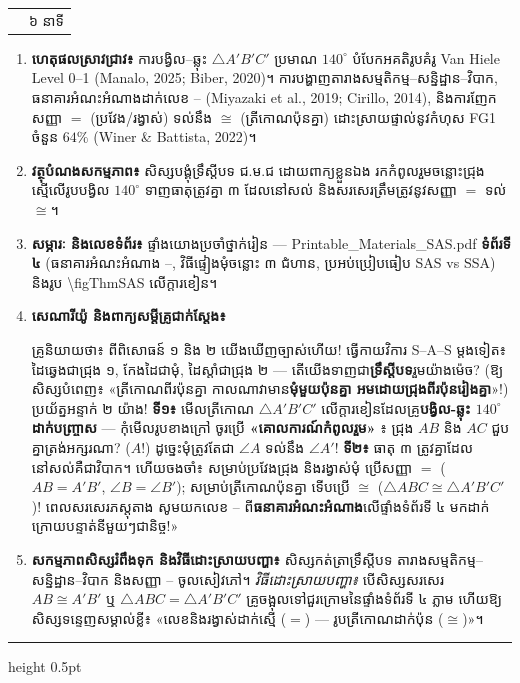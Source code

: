 \documentclass[a4paper,12pt]{article}
\makeatletter
\newcommand{\en}[1]{{\TimesEn #1}}
\newcommand{\enbf}[1]{{\TimesEn\textbf{#1}}}
\newcommand{\cnum}[1]{{\fontsize{10.5pt}{12pt}\selectfont\ding{\numexpr181+#1\relax}}}
\newcommand{\tri}[1]{\ensuremath{\triangle #1}}
\newcommand{\ang}[1]{\ensuremath{\angle #1}}
\newcommand{\cg}{\ensuremath{\cong}}
\newenvironment{phasebox}[3]{%
  \needspace{2.2cm}%
  \begin{tcolorbox}[
    enhanced, sharp corners, colback=headgray, colframe=black,
    boxrule=1.0pt, top=4pt, bottom=4pt, left=9pt, right=9pt,
    before skip=7pt, after skip=3pt
  ]%
    \renewcommand{\arraystretch}{1.0}%
    \begin{tabular*}{\linewidth}{@{}>{\raggedright\arraybackslash}p{13.60cm}@{\extracolsep{\fill}}r@{}}
      {\muol\fontsize{11pt}{17.5pt}\selectfont #1} & {\fontsize{10.5pt}{15pt}\selectfont\en{#2 |} #3}%
    \end{tabular*}%
  \end{tcolorbox}%
  \begingroup\fontsize{11.5pt}{18.2pt}\selectfont
}{%
  \par\endgroup\vspace{3pt}\hrule height 0.5pt\vspace{5pt}%
}
\makeatother
\begin{document}
\begin{phasebox}{ជំហានទី ៣ \enbf{(}ខ\enbf{)} \enbf{--- E3 Explain}៖ បង្គុំទ្រឹស្ដីបទ \enbf{SAS,} គោលការណ៍កំពូលរួម \enbf{\&} ធនាគារហេតុផល \cnum{1}\enbf{--}\cnum{5}}{22--28 min}{៦ នាទី}
  \begin{enumerate}[leftmargin=0.45cm, topsep=2pt, itemsep=4pt, parsep=0pt]
    \item \textbf{ហេតុផលស្រាវជ្រាវ៖} ការបង្វិល--ឆ្លុះ $\tri{A'B'C'}$ ប្រមាណ $140^\circ$ បំបែកអគតិរូបគំរូ \en{Van Hiele Level 0--1 (Manalo, 2025; Biber, 2020)}។ ការបង្ហាញតារាងសម្មតិកម្ម--សន្និដ្ឋាន--វិបាក, ធនាគារអំណះអំណាងដាក់លេខ \cnum{1}--\cnum{5} \en{(Miyazaki et al., 2019; Cirillo, 2014)}, និងការញែកសញ្ញា $=$ (ប្រវែង/រង្វាស់) ទល់នឹង $\cg$ (ត្រីកោណប៉ុនគ្នា) ដោះស្រាយផ្ទាល់នូវកំហុស \en{FG1} ចំនួន $64\%$ \en{(Winer \& Battista, 2022)}។
    \item \textbf{វត្ថុបំណងសកម្មភាព៖} សិស្សបង្គុំទ្រឹស្ដីបទ ជ.ម.ជ ដោយពាក្យខ្លួនឯង រកកំពូលរួមចន្លោះជ្រុងស្មើលើរូបបង្វិល $140^\circ$ ទាញធាតុត្រូវគ្នា ៣ ដែលនៅសល់ និងសរសេរត្រឹមត្រូវនូវសញ្ញា $=$ ទល់ $\cg$។
    \item \textbf{សម្ភារៈ និងលេខទំព័រ៖} ផ្ទាំងយោងប្រចាំថ្នាក់រៀន — \en{Printable\_Materials\_SAS.pdf} \textbf{ទំព័រទី ៤} (ធនាគារអំណះអំណាង \cnum{1}--\cnum{5}, វិធីផ្ទៀងមុំចន្លោះ ៣ ជំហាន, ប្រអប់ប្រៀបធៀប \en{SAS} vs \en{SSA}) និងរូប \en{\textbackslash figThmSAS} លើក្ដារខៀន។
    \item \textbf{សេណារីយ៉ូ និងពាក្យសម្ដីគ្រូជាក់ស្ដែង៖}
      \begin{scriptbox}
        {\muol\fontsize{10.8pt}{17pt}\selectfont \enbf{«}គ្រូនិយាយថា៖} ពីពិសោធន៍ ១ និង ២ យើងឃើញច្បាស់ហើយ! ធ្វើកាយវិការ \en{S--A--S} ម្ដងទៀត៖ ដៃឆ្វេងជាជ្រុង ១, កែងដៃជាមុំ, ដៃស្ដាំជាជ្រុង ២ — តើយើងទាញជា\textbf{ទ្រឹស្ដីបទ}រួមយ៉ាងម៉េច? (ឱ្យសិស្សបំពេញ៖ «ត្រីកោណពីរប៉ុនគ្នា កាលណាវាមាន\textbf{មុំមួយប៉ុនគ្នា អមដោយជ្រុងពីរប៉ុនរៀងគ្នា}»!)\\
        ប្រយ័ត្នអន្ទាក់ ២ យ៉ាង! \textbf{ទី១៖} មើលត្រីកោណ $\tri{A'B'C'}$ លើក្ដារខៀនដែលគ្រូ\textbf{បង្វិល-ឆ្លុះ $140^\circ$ ដាក់បញ្ច្រាស} — កុំមើលរូបខាងក្រៅ ចូរប្រើ \textbf{«គោលការណ៍កំពូលរួម»} ៖ ជ្រុង $AB$ និង $AC$ ជួបគ្នាត្រង់អក្សរណា? ($A$!) ដូច្នេះមុំត្រូវតែជា $\ang{A}$ ទល់នឹង $\ang{A'}$! \textbf{ទី២៖} ធាតុ ៣ ត្រូវគ្នាដែលនៅសល់គឺជាវិបាក។ ហើយចងចាំ៖ សម្រាប់ប្រវែងជ្រុង និងរង្វាស់មុំ ប្រើសញ្ញា \textbf{$=$} ($AB = A'B'$, $\ang{B} = \ang{B'}$); សម្រាប់ត្រីកោណប៉ុនគ្នា ទើបប្រើ \textbf{$\cg$} ($\tri{ABC} \cg \tri{A'B'C'}$)! ពេលសរសេរភស្តុតាង សូមយកលេខ \cnum{1}--\cnum{5} ពី\textbf{ធនាគារអំណះអំណាង}លើផ្ទាំងទំព័រទី ៤ មកដាក់ក្រោយបន្ទាត់នីមួយៗជានិច្ច!»
      \end{scriptbox}
    \item \textbf{សកម្មភាពសិស្សរំពឹងទុក និងវិធីដោះស្រាយបញ្ហា៖} សិស្សកត់ត្រាទ្រឹស្ដីបទ តារាងសម្មតិកម្ម--សន្និដ្ឋាន--វិបាក និងសញ្ញា \cnum{1}--\cnum{5} ចូលសៀវភៅ។ \textit{វិធីដោះស្រាយបញ្ហា៖} បើសិស្សសរសេរ $AB \cg A'B'$ ឬ $\tri{ABC} = \tri{A'B'C'}$ គ្រូចង្អុលទៅជួរក្រោមនៃផ្ទាំងទំព័រទី ៤ ភ្លាម ហើយឱ្យសិស្សទន្ទេញសម្គាល់ខ្លី៖ «លេខនិងរង្វាស់ដាក់ស្មើ ($=$) — រូបត្រីកោណដាក់ប៉ុន ($\cg$)»។
  \end{enumerate}
\end{phasebox}
\end{document}
